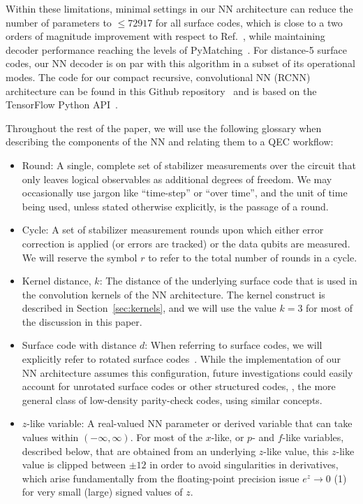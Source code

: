 Within these limitations, minimal settings in our NN architecture can reduce the number of parameters to $\leq 72917$ for all surface codes, which is close to a two orders of magnitude improvement with respect to Ref.~\cite{Bausch:2023jgi}, while maintaining decoder performance reaching the levels of PyMatching~\cite{Higgott:2023}. For distance-5 surface codes, our NN decoder is on par with this algorithm in a subset of its operational modes. The code for our compact recursive, convolutional NN (RCNN) architecture can be found in this Github repository~\cite{ourcode} and is based on the TensorFlow Python API~\cite{tensorflow,tensorflow2}.

Throughout the rest of the paper, we will use the following glossary when describing the components of the NN and relating them to a QEC workflow:
\begin{itemize}
\item Round: A single, complete set of stabilizer measurements over the circuit that only leaves logical observables as additional degrees of freedom.
We may occasionally use jargon like ``time-step'' or ``over time'', and the unit of time being used, unless stated otherwise explicitly, is the passage of a round.
\item Cycle: A set of stabilizer measurement rounds upon which either error correction is applied (or errors are tracked) or the data qubits are measured. We will reserve the symbol $r$ to refer to the total number of rounds in a cycle.
\item Kernel distance, $k$: The distance of the underlying surface code that is used in the convolution kernels of the NN architecture. The kernel construct is described in Section~\ref{sec:kernels}, and we will use the value $k=3$ for most of the discussion in this paper.
\item Surface code with distance $d$: When referring to surface codes, we will explicitly refer to rotated surface codes~\cite{Bombin:2007}. While the implementation of our NN architecture assumes this configuration, future investigations could easily account for unrotated surface codes or other structured codes, \eg, the more general class of low-density parity-check codes, using similar concepts.
\item $z$-like variable: A real-valued NN parameter or derived variable that can take values within $(-\infty, \infty)$. For most of the $x$-like, or $p$- and $f$-like variables, described below, that are obtained from an underlying $z$-like value, this $z$-like value is clipped between $\pm12$ in order to avoid singularities in derivatives, which arise fundamentally from the floating-point precision issue $e^z \to 0$ (1) for very small (large) signed values of $z$.

\end{itemize}
